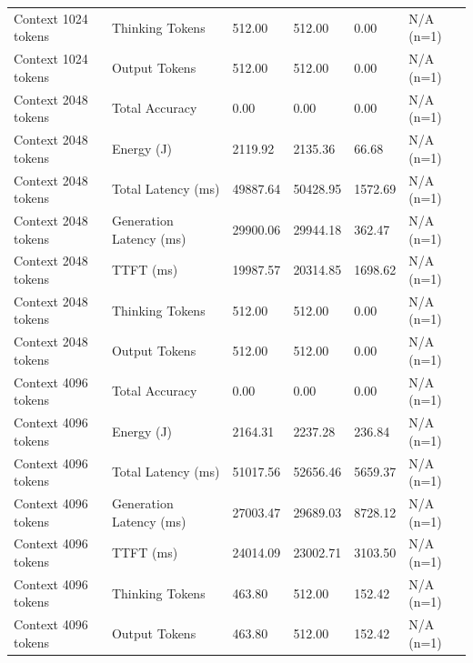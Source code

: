 \begin{table}
\begin{tabular}{llllll}
Context 1024 tokens & Thinking Tokens & 512.00 & 512.00 & 0.00 & N/A (n=1) \\
Context 1024 tokens & Output Tokens & 512.00 & 512.00 & 0.00 & N/A (n=1) \\
Context 2048 tokens & Total Accuracy & 0.00 & 0.00 & 0.00 & N/A (n=1) \\
Context 2048 tokens & Energy (J) & 2119.92 & 2135.36 & 66.68 & N/A (n=1) \\
Context 2048 tokens & Total Latency (ms) & 49887.64 & 50428.95 & 1572.69 & N/A (n=1) \\
Context 2048 tokens & Generation Latency (ms) & 29900.06 & 29944.18 & 362.47 & N/A (n=1) \\
Context 2048 tokens & TTFT (ms) & 19987.57 & 20314.85 & 1698.62 & N/A (n=1) \\
Context 2048 tokens & Thinking Tokens & 512.00 & 512.00 & 0.00 & N/A (n=1) \\
Context 2048 tokens & Output Tokens & 512.00 & 512.00 & 0.00 & N/A (n=1) \\
Context 4096 tokens & Total Accuracy & 0.00 & 0.00 & 0.00 & N/A (n=1) \\
Context 4096 tokens & Energy (J) & 2164.31 & 2237.28 & 236.84 & N/A (n=1) \\
Context 4096 tokens & Total Latency (ms) & 51017.56 & 52656.46 & 5659.37 & N/A (n=1) \\
Context 4096 tokens & Generation Latency (ms) & 27003.47 & 29689.03 & 8728.12 & N/A (n=1) \\
Context 4096 tokens & TTFT (ms) & 24014.09 & 23002.71 & 3103.50 & N/A (n=1) \\
Context 4096 tokens & Thinking Tokens & 463.80 & 512.00 & 152.42 & N/A (n=1) \\
Context 4096 tokens & Output Tokens & 463.80 & 512.00 & 152.42 & N/A (n=1) \\
\bottomrule
\end{tabular}
\end{table}
